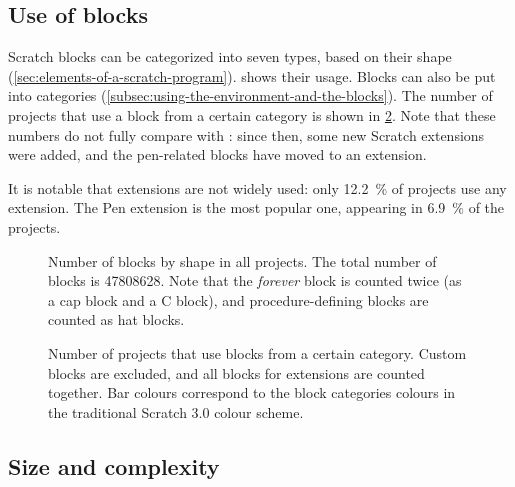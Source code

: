 \documentclass[../main]{subfiles}
\begin{document}
\subsection{Use of blocks}\label{subsec:use-of-blocks}

Scratch blocks can be categorized into seven types, based on their shape (\cref{sec:elements-of-a-scratch-program}).
 shows their usage.
Blocks can also be put into categories (\cref{subsec:using-the-environment-and-the-blocks}).
The number of projects that use a block from a certain category is shown in \cref{fig:block-categories}.
Note that these numbers do not fully compare with \textcite{aivaloglouHowKidsCode2016}: since then, some new Scratch extensions were added, and the pen-related blocks have moved to an extension.

It is notable that extensions are not widely used: only \qty{12.2}{\percent} of projects use any extension.
The Pen extension is the most popular one, appearing in \qty{6.9}{\percent} of the projects.

\begin{figure}
    \centering
    
    \caption{
        Number of blocks by shape in all projects.
        The total number of blocks is \num{47808628}.
        Note that the \textit{forever} block is counted twice (as a cap block and a C block), and procedure-defining blocks are counted as hat blocks.
    }
    \label{fig:block-shapes}
\end{figure}

\begin{figure}
    \centering
    
    \caption{
        Number of projects that use blocks from a certain category.
        Custom blocks are excluded, and all blocks for extensions are counted together.
        Bar colours correspond to the block categories colours in the traditional Scratch 3.0 colour scheme.
    }
    \label{fig:block-categories}
\end{figure}

\subsection{Size and complexity}\label{subsec:size-and-complexity}
\end{document}
